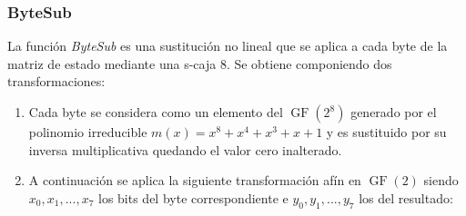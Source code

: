 	\subsubsection{ByteSub}
		La función \emph{ByteSub} es una sustitución no lineal que se aplica a cada byte de la matriz de estado mediante una s-caja 8. Se obtiene componiendo dos transformaciones:
		\begin{enumerate}
			\item Cada byte se considera como un elemento del $\operatorname{GF}(2^8)$ generado por el polinomio irreducible $m(x)=x^8+x^4+x^3+x+1$ y es sustituido por su inversa multiplicativa quedando el valor cero inalterado. 
			\item A continuación se aplica la siguiente transformación afín en $\operatorname{GF}(2)$ siendo $x_0, x_1,...,x_7$ los bits del byte correspondiente e $y_0, y_1,...,y_7$ los del resultado:


\end{enumerate}
